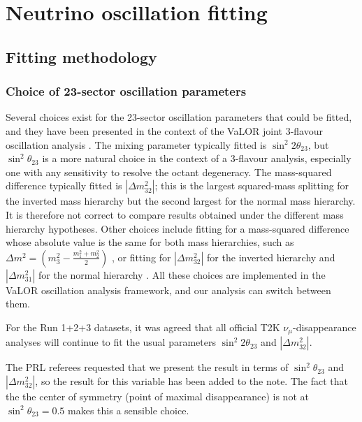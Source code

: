 \clearpage

\section {Neutrino oscillation fitting}
\label{sec:oscfit}

\subsection {Fitting methodology}
\label{sec:oscfit_method}

\subsubsection {Choice of 23-sector oscillation parameters}
\label{sec:oscfit_method_23param_choice}

Several choices exist for the 23-sector oscillation parameters that could be fitted, 
and they have been presented in the context of the VaLOR joint 3-flavour oscillation analysis \cite{Lorena}.
The mixing parameter typically fitted is $\sin^{2}2\theta_{23}$, 
but $\sin^{2}\theta_{23}$ is a more natural choice in the context of a 3-flavour analysis,
especially one with any sensitivity to resolve the octant degeneracy.
The mass-squared difference typically fitted is $|\Delta m^{2}_{32}|$; this is the largest squared-mass splitting for the inverted mass
hierarchy but the second largest for the normal mass hierarchy. 
It is therefore not correct to compare results obtained under the different mass hierarchy hypotheses.
Other choices include fitting for a mass-squared difference whose absolute value is the same for both mass hierarchies,
such as $\Delta m^{2} = \left(m_{3}^{2} - \frac {m_{1}^{2}+m_{2}^{2}} {2} \right)$ \cite{FogliLisi},
or fitting for $|\Delta m^{2}_{32}|$ for the inverted hierarchy and $|\Delta m^{2}_{31}|$ for the normal hierarchy \cite{GonzalezGarcia}.
All these choices are implemented in the VaLOR oscillation analysis framework, and our analysis can switch between them.

For the Run 1+2+3 datasets, it was agreed that all official T2K $\nu_{\mu}$-disappearance analyses will continue 
to fit the usual parameters $\sin^{2}2\theta_{23}$ and $|\Delta m^{2}_{32}|$.

The PRL referees requested that we present the result in terms of $\sin^2\theta_{23}$ and $|\Delta m^{2}_{32}|$,
so the result for this variable has been added to the note.
The fact that the the center of symmetry (point of maximal disappearance) is not at $\sin^2\theta_{23} = 0.5$ makes this a sensible choice.

